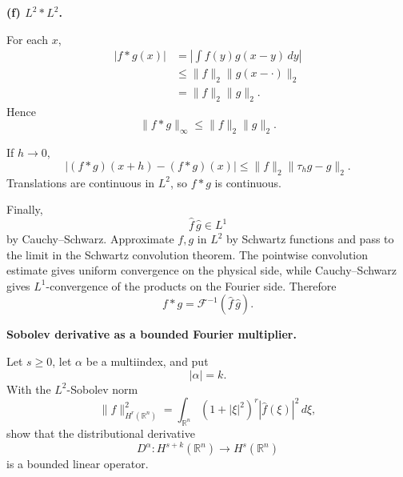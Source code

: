 \begin{solution}
\par\smallskip\noindent\textbf{(f) \(L^2*L^2\).}

For each \(x\),
\[
\begin{aligned}
|f*g(x)|
&=
\left|
\int f(y)g(x-y)\,dy
\right|\\
&\le
\|f\|_2\|g(x-\cdot)\|_2\\
&=
\|f\|_2\|g\|_2.
\end{aligned}
\]
Hence
\[
\boxed{\|f*g\|_\infty\le\|f\|_2\|g\|_2.}
\]

If \(h\to0\),
\[
|(f*g)(x+h)-(f*g)(x)|
\le
\|f\|_2\|\tau_hg-g\|_2.
\]
Translations are continuous in \(L^2\), so \(f*g\) is continuous.

Finally,
\[
\widehat f\,\widehat g\in L^1
\]
by Cauchy--Schwarz. Approximate \(f,g\) in \(L^2\) by Schwartz functions
and pass to the limit in the Schwartz convolution theorem. The pointwise
convolution estimate gives uniform convergence on the physical side, while
Cauchy--Schwarz gives \(L^1\)-convergence of the products on the Fourier
side. Therefore
\[
\boxed{
f*g
=
\mathcal F^{-1}(\widehat f\,\widehat g).}
\]
\end{solution}


\begin{problem}[CP-III-0006]
\label{prob:cp-iii-0006}
\textbf{Sobolev derivative as a bounded Fourier multiplier.}

Let \(s\ge0\), let \(\alpha\) be a multiindex, and put
\[
|\alpha|=k.
\]
With the \(L^2\)-Sobolev norm
\[
\|f\|_{H^r(\mathbb R^n)}^2
=
\int_{\mathbb R^n}
(1+|\xi|^2)^r|\widehat f(\xi)|^2\,d\xi,
\]
show that the distributional derivative
\[
D^\alpha:
H^{s+k}(\mathbb R^n)
\longrightarrow
H^s(\mathbb R^n)
\]
is a bounded linear operator.
\end{problem}

